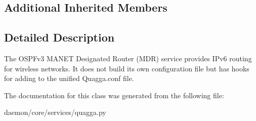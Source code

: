 \subsection*{Additional Inherited Members}


\subsection{Detailed Description}
\begin{DoxyVerb}The OSPFv3 MANET Designated Router (MDR) service provides IPv6
    routing for wireless networks. It does not build its own
    configuration file but has hooks for adding to the
    unified Quagga.conf file.
\end{DoxyVerb}
 

The documentation for this class was generated from the following file\+:\begin{DoxyCompactItemize}
\item 
daemon/core/services/quagga.\+py\end{DoxyCompactItemize}
